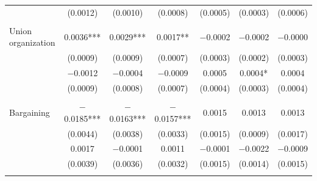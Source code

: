 \documentclass[12pt,letterpaper]{article}
\begin{document}
\begin{longtable}{l cccccc}
  & (0.0012) & (0.0010) & (0.0008) & (0.0005) & (0.0003) & (0.0006) \\
 & & & & & & \\
\quad Union organization & 0.0036*** & 0.0029*** & 0.0017** & $-$0.0002 & $-$0.0002 & $-$0.0000 \\
  & (0.0009) & (0.0009) & (0.0007) & (0.0003) & (0.0002) & (0.0003) \\
  & $-$0.0012 & $-$0.0004 & $-$0.0009 & 0.0005 & 0.0004* & 0.0004 \\
  & (0.0009) & (0.0008) & (0.0007) & (0.0004) & (0.0003) & (0.0004) \\
 & & & & & & \\
\quad Bargaining & $-$0.0185*** & $-$0.0163*** & $-$0.0157*** & 0.0015 & 0.0013 & 0.0013 \\
  & (0.0044) & (0.0038) & (0.0033) & (0.0015) & (0.0009) & (0.0017) \\
  & 0.0017 & $-$0.0001 & 0.0011 & $-$0.0001 & $-$0.0022 & $-$0.0009 \\
  & (0.0039) & (0.0036) & (0.0032) & (0.0015) & (0.0014) & (0.0015) \\
 & & & & & & \\
\end{longtable}
\end{document}
